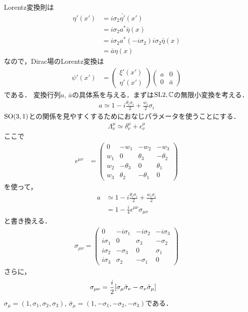 Lorentz変換則は
\begin{align}
		\eta'(x')
		&= i\sigma_2\bar{\eta'}(x')\\
		&= i\sigma_2a^{*}\bar{\eta}(x)\\
		&= i\sigma_2a^{*}(-i\sigma_2)i\sigma_2\bar{\eta}(x)\\
		&= \bar{a}\eta(x)
\end{align}
なので，Dirac場のLorentz変換は
\begin{align}
		\psi'(x')
		&= 
		\begin{pmatrix}
				\xi'(x')\\
				\eta'(x')
		\end{pmatrix}
		\begin{pmatrix}
				a & 0\\
				0 & \bar{a}
		\end{pmatrix}
\end{align}
である．
変換行列$a$, $\bar{a}$の具体系を与える．まずは$\mathrm{SL}{2, \mathbb{C}}$の無限小変換を考える．
\begin{align}
		a \simeq 1 - i\frac{\theta_i\sigma_i}{2} + \frac{w_i}{2}\sigma_i
\end{align}
$\mathrm{SO}(3, 1)$との関係を見やすくするためにおなじパラメータを使うことにする．
\begin{align}
		\Lambda^{\mu}_{\nu} \simeq \delta^{\mu}_{\nu} + \epsilon^{\mu}_{\nu}
\end{align}
ここで
\begin{align}
		\epsilon^{\mu\nu}
		&=
		\begin{pmatrix}
				0 & -w_1 & -w_2 & -w_3\\
				w_1 & 0 & \theta_3 & -\theta_2\\
				w_2 & -\theta_3 & 0 & \theta_1\\
				w_3 & \theta_2 & -\theta_1 & 0
		\end{pmatrix}
\end{align}
を使って，
\begin{align}
		a &\simeq 1 - i\frac{\theta_i\sigma_i}{2} + \frac{w_i\sigma_i}{2}\\
		  &= 1 - \frac{i}{4}\epsilon^{\mu\nu}\sigma_{\mu\nu}
\end{align}
と書き換える．
\begin{align}
		\sigma_{\mu\nu} = 
		\begin{pmatrix}
				0 & -i\sigma_1 & -i\sigma_2 & -i\sigma_3\\
				i\sigma_1 & 0 & \sigma_3 & -\sigma_2\\
				i\sigma_2 & -\sigma_3 & 0 & \sigma_1\\
				i\sigma_3 & \sigma_2 & -\sigma_1 & 0
		\end{pmatrix}
\end{align}
さらに，
\begin{align}
		\sigma_{\mu\nu} &= \frac{i}{2}\qty[\sigma_{\mu}\bar{\sigma}_{\nu} - \sigma_{\nu}\bar{\sigma}_{\mu}]
\end{align}
$\sigma_{\mu} = (1, \sigma_1, \sigma_2, \sigma_3)$, $\bar{\sigma}_{\mu} = (1, -\sigma_1, -\sigma_2, -\sigma_3)$である．

